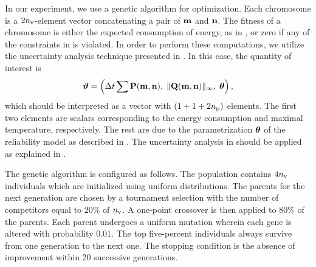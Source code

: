 In our experiment, we use a genetic algorithm for optimization.
Each chromosome is a $2 {n_\text{v}}$-element vector concatenating a pair of $\mathbf{m}$ and $\mathbf{n}$.
The fitness of a chromosome is either the expected consumption of energy, as in , or zero if any of the constraints in  is violated.
In order to perform these computations, we utilize the uncertainty analysis technique presented in .
In this case, the quantity of interest is
\begin{equation} \elab{quantity-of-interest}
  \vw = \left( \dt \sum \mP(\mapping, \priority), \; \norm[\infty]{\mQ(\mapping, \priority)}, \; \pvw \right),
\end{equation}
which should be interpreted as a vector with $(1 + 1 + 2 {n_\text{p}})$ elements.
The first two elements are scalars corresponding to the energy consumption and maximal temperature, respectively.
The rest are due to the parametrization $\bm{\theta}$ of the reliability model as described in .
The uncertainty analysis in  should be applied as explained in .

The genetic algorithm is configured as follows.
The population contains $4 {n_\text{v}}$ individuals which are initialized using uniform distributions.
The parents for the next generation are chosen by a tournament selection with the number of competitors equal to 20\% of ${n_\text{v}}$.
A one-point crossover is then applied to 80\% of the parents.
Each parent undergoes a uniform mutation wherein each gene is altered with probability 0.01.
The top five-percent individuals always survive from one generation to the next one.
The stopping condition is the absence of improvement within 20 successive generations.
